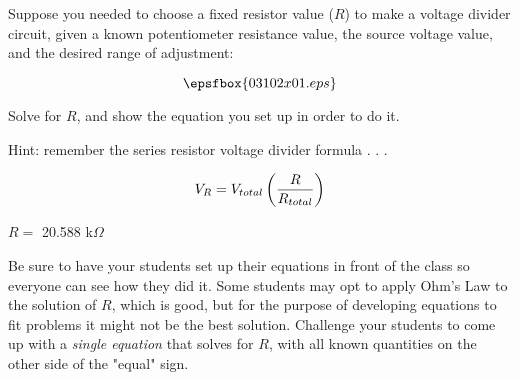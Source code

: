 

Suppose you needed to choose a fixed resistor value ($R$) to make a voltage divider circuit, given a known potentiometer resistance value, the source voltage value, and the desired range of adjustment:

$$\epsfbox{03102x01.eps}$$

Solve for $R$, and show the equation you set up in order to do it.

\vskip 10pt

Hint: remember the series resistor voltage divider formula . . .

$$V_R = V_{total}\left( {R \over R_{total}} \right)$$







$R =$ 20.588 k$\Omega$







Be sure to have your students set up their equations in front of the class so everyone can see how they did it.  Some students may opt to apply Ohm's Law to the solution of $R$, which is good, but for the purpose of developing equations to fit problems it might not be the best solution.  Challenge your students to come up with a {\it single equation} that solves for $R$, with all known quantities on the other side of the "equal" sign.




